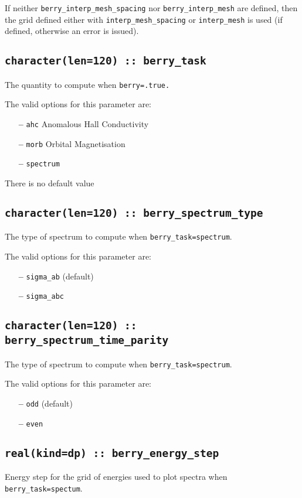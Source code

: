 If neither {\tt berry\_interp\_mesh\_spacing} nor  {\tt berry\_interp\_mesh} are defined, then the grid defined either with {\tt interp\_mesh\_spacing} or {\tt interp\_mesh} is used (if defined, otherwise an error is issued).



\subsection[berry\_task]{\tt character(len=120) ::  berry\_task}
The quantity to compute when {\tt berry=.true.}

The valid options for this parameter are:
\begin{itemize}
\item[{\bf --}]  \verb#ahc# Anomalous Hall Conductivity
\item[{\bf --}]  \verb#morb# Orbital Magnetisation
\item[{\bf --}] \verb#spectrum# 
\end{itemize}
There is no default value



\subsection[berry\_spectrum\_type]{\tt character(len=120) ::  berry\_spectrum\_type}
The type of spectrum to compute when {\tt berry\_task=spectrum}. 

The valid options for this parameter are:
\begin{itemize}
\item[{\bf --}]  \verb#sigma_ab# (default) 
\item[{\bf --}]  \verb#sigma_abc#  
\end{itemize}

\subsection[berry\_spectrum\_time\_parity]{\tt character(len=120) ::  berry\_spectrum\_time\_parity}
The type of spectrum to compute when {\tt berry\_task=spectrum}. 

The valid options for this parameter are:
\begin{itemize}
\item[{\bf --}]  \verb#odd# (default) 
\item[{\bf --}]  \verb#even#  
\end{itemize}

\subsection[berry\_energy\_step]{\tt real(kind=dp) :: berry\_energy\_step}
Energy step for the grid of energies used to plot spectra when {\tt berry\_task=spectum}.

